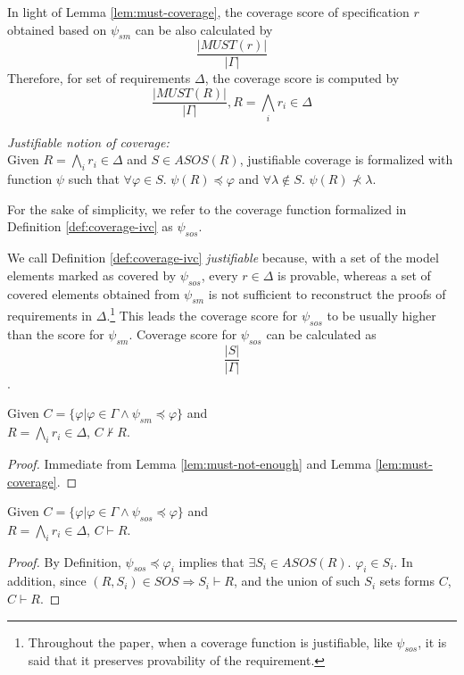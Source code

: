 In light of Lemma \ref{lem:must-coverage}, the coverage score of specification $r$ obtained based on $\psi_{sm}$ can be also calculated by
$$\frac{|MUST(r)|}{|\Gamma|}$$
Therefore, for set of requirements $\Delta$, the coverage score is computed by $$\frac{|MUST(R)|}{|\Gamma|},\xspace  R = \bigwedge_{i} {r_i \in \Delta}$$

\begin{definition} {\emph{Justifiable notion of coverage:}} \\
  \label{def:coverage-ivc}
  Given $R = \bigwedge_{i} {r_i \in \Delta}$ and $S \in ASOS(R)$, justifiable coverage is formalized with function $\psi$ such that  $\forall \varphi \in S$. $\psi (R) \preccurlyeq \varphi$
  and $\forall \lambda \notin S$. $\psi (R) \nprec \lambda$.
\end{definition}
\vspace{2mm}

For the sake of simplicity, we refer to the coverage function
formalized in Definition \ref{def:coverage-ivc} as $\psi_{sos}$.

We call Definition \ref{def:coverage-ivc} \emph{justifiable} because, with a set of the model elements marked as covered by $\psi_{sos}$, every $r \in \Delta$ is provable, whereas a set of covered elements obtained from $\psi_{sm}$ is not sufficient to reconstruct the proofs of requirements in $\Delta$.\footnote{Throughout the paper, when a coverage function is justifiable, like $\psi_{sos}$, it is said that it preserves provability of the requirement.}
This leads the coverage score for $\psi_{sos}$ to be usually higher than the score for $\psi_{sm}$. Coverage score for $\psi_{sos}$ can be calculated as $$\frac{|S|}{|\Gamma|}$$.

\begin{theorem}
\label{thm:cov-must}
Given $C = \{\varphi | \varphi \in \Gamma \wedge \psi_{sm} \preccurlyeq \varphi \}$
and \\ $R = \bigwedge_{i} {r_i \in \Delta}$, $C \nvdash R$.
\end{theorem}
\begin{proof}
Immediate from Lemma \ref{lem:must-not-enough} and Lemma \ref{lem:must-coverage}.
\end{proof}
\vspace{2mm}

\begin{theorem}
\label{thm:cov-sos}
Given $C = \{\varphi | \varphi \in \Gamma \wedge  \psi_{sos} \preccurlyeq \varphi \}$
and \\ $R = \bigwedge_{i} {r_i \in \Delta}$, $C \vdash R$.
\end{theorem}
\begin{proof}
By Definition, $\psi_{sos} \preccurlyeq \varphi_i$ implies that $\exists S_i \in ASOS(R)$. $\varphi_i \in S_i$.
In addition, since $(R, S_i) \in SOS \Rightarrow S_i \vdash R$, and the union of such $S_i$ sets
forms $C$,
$C \vdash R$.
\end{proof}
\vspace{2mm}

